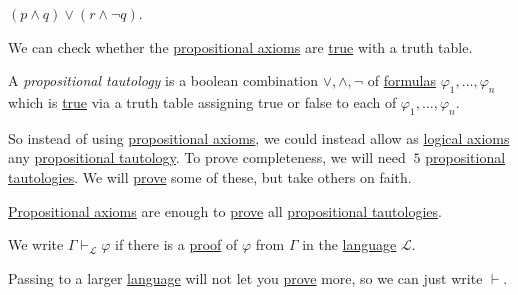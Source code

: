\begin{prev}
	\((p \land q) \lor (r \land \lnot q)\).
\end{prev}

\begin{remark}
	We can check whether the \hyperref[def:propositional-axioms]{propositional axioms} are \hyperref[def:truth]{true} with a truth table.
\end{remark}

\begin{definition}\label{def:propositional-tautology}
	A \emph{propositional tautology} is a boolean combination \(\lor , \land , \lnot \) of \hyperref[def:formula]{formulas} \(\varphi _1, \ldots , \varphi _n\) which is \hyperref[def:truth]{true} via a truth table assigning true or false to each of \(\varphi _1, \ldots , \varphi _n\).
\end{definition}

So instead of using \hyperref[def:propositional-axioms]{propositional axioms}, we could instead allow as \hyperref[def:logical-axioms]{logical axioms} any \hyperref[def:propositional-tautology]{propositional tautology}. To prove completeness, we will need \(~5\) \hyperref[def:propositional-tautology]{propositional tautologies}. We will \hyperref[def:proof]{prove} some of these, but take others on faith.

\begin{remark}
	\hyperref[def:propositional-axioms]{Propositional axioms} are enough to \hyperref[def:proof]{prove} all \hyperref[def:propositional-tautology]{propositional tautologies}.
\end{remark}

\begin{notation}
	We write \(\Gamma \vdash_\mathcal{L} \varphi \) if there is a \hyperref[def:proof]{proof} of \(\varphi \) from \(\Gamma \) in the \hyperref[def:language]{language} \(\mathcal{L} \).
\end{notation}

\begin{note}
	Passing to a larger \hyperref[def:language]{language} will not let you \hyperref[def:proof]{prove} more, so we can just write \(\vdash \).
\end{note}